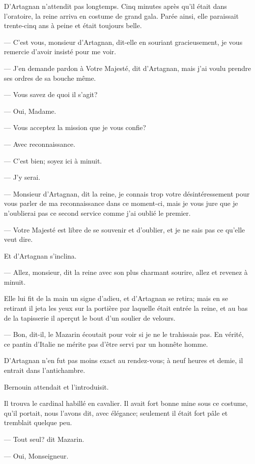 D'Artagnan n'attendit pas longtemps. Cinq minutes après qu'il était dans l'oratoire, la reine arriva en costume de grand gala. Parée ainsi, elle paraissait trente-cinq ans à peine et était toujours belle.

— C'est vous, monsieur d'Artagnan, dit-elle en souriant gracieusement, je vous remercie d'avoir insisté pour me voir.

— J'en demande pardon à Votre Majesté, dit d'Artagnan, mais j'ai voulu prendre ses ordres de sa bouche même.

— Vous savez de quoi il s'agit?

— Oui, Madame.

— Vous acceptez la mission que je vous confie?

— Avec reconnaissance.

— C'est bien; soyez ici à minuit.

— J'y serai.

— Monsieur d'Artagnan, dit la reine, je connais trop votre désintéressement pour vous parler de ma reconnaissance dans ce moment-ci, mais je vous jure que je n'oublierai pas ce second service comme j'ai oublié le premier.

— Votre Majesté est libre de se souvenir et d'oublier, et je ne sais pas ce qu'elle veut dire.

Et d'Artagnan s'inclina.

— Allez, monsieur, dit la reine avec son plus charmant sourire, allez et revenez à minuit.

Elle lui fit de la main un signe d'adieu, et d'Artagnan se retira; mais en se retirant il jeta les yeux sur la portière par laquelle était entrée la reine, et au bas de la tapisserie il aperçut le bout d'un soulier de velours.

— Bon, dit-il, le Mazarin écoutait pour voir si je ne le trahissais pas. En vérité, ce pantin d'Italie ne mérite pas d'être servi par un honnête homme.

D'Artagnan n'en fut pas moins exact au rendez-vous; à neuf heures et demie, il entrait dans l'antichambre.

Bernouin attendait et l'introduisit.

Il trouva le cardinal habillé en cavalier. Il avait fort bonne mine sous ce costume, qu'il portait, nous l'avons dit, avec élégance; seulement il était fort pâle et tremblait quelque peu.

— Tout seul? dit Mazarin.

— Oui, Monseigneur.

